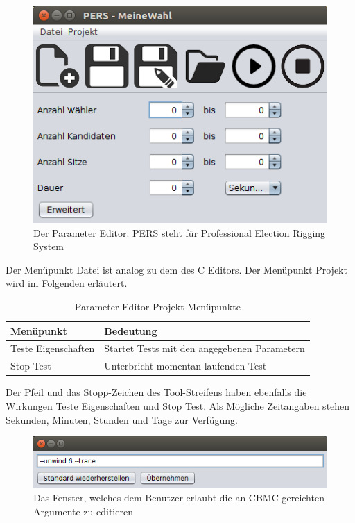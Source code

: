 \documentclass[a4paper]{scrreprt}
\begin{document}
\begin{figure}[H]
\includegraphics[scale=0.6]{Parameter-Editor.png}
\caption{Der Parameter Editor. PERS steht für Professional Election Rigging System}
\label{Parameter-editor}
\end{figure}

Der Menüpunkt Datei ist analog zu dem des C Editors. Der Menüpunkt Projekt wird im Folgenden erläutert. 

\begin{table}[H]
\begin{tabular}{|p{5cm}|p{10cm}|}
Menüpunkt & Bedeutung \\
\hline
Teste Eigenschaften & Startet Tests mit den angegebenen Parametern \\
Stop Test & Unterbricht momentan laufenden Test
\end{tabular}
\label{Parameter-Projekt-Menü}
\caption{Parameter Editor Projekt Menüpunkte}
\end{table}

Der Pfeil und das Stopp-Zeichen des Tool-Streifens haben ebenfalls die Wirkungen Teste Eigenschaften und Stop Test. Als Mögliche Zeitangaben stehen Sekunden, Minuten, Stunden und Tage zur Verfügung. 

\begin{figure}[H]
\includegraphics[scale=0.6]{CBMC-Args-Editor.png}
\caption{Das Fenster, welches dem \gls{Benutzer} erlaubt die an CBMC gereichten Argumente zu editieren}
\label{Argumente-editor}
\end{figure}
\end{document}
